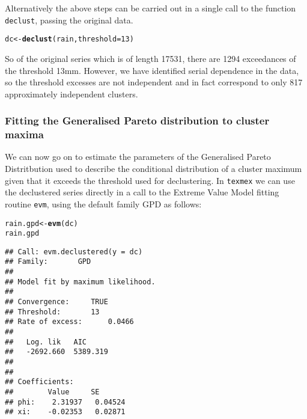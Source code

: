 \documentclass[10pt]{article}\usepackage[]{graphicx}\usepackage[]{color}
\makeatletter
\newcommand{\hlnum}[1]{\textcolor[rgb]{0.686,0.059,0.569}{#1}}%
\newcommand{\hlstd}[1]{\textcolor[rgb]{0.345,0.345,0.345}{#1}}%
\newcommand{\hlkwb}[1]{\textcolor[rgb]{0.69,0.353,0.396}{#1}}%
\newcommand{\hlkwc}[1]{\textcolor[rgb]{0.333,0.667,0.333}{#1}}%
\newcommand{\hlkwd}[1]{\textcolor[rgb]{0.737,0.353,0.396}{\textbf{#1}}}%
\newenvironment{kframe}{%
 \def\at@end@of@kframe{}%
 \ifinner\ifhmode%
  \def\at@end@of@kframe{\end{minipage}}%
  \begin{minipage}{\columnwidth}%
 \fi\fi%
 \def\FrameCommand##1{\hskip\@totalleftmargin \hskip-\fboxsep
 \colorbox{shadecolor}{##1}\hskip-\fboxsep
     \hskip-\linewidth \hskip-\@totalleftmargin \hskip\columnwidth}%
 \MakeFramed {\advance\hsize-\width
   \@totalleftmargin\z@ \linewidth\hsize
   \@setminipage}}%
 {\par\unskip\endMakeFramed%
 \at@end@of@kframe}
\newenvironment{knitrout}{}{} %
\makeatother
\begin{document}
Alternatively the above steps can be carried out in a single call to the function {\tt declust}, passing the original data.

\begin{knitrout}
\color{fgcolor}\begin{kframe}
\begin{alltt}
\hlstd{dc} \hlkwb{<-} \hlkwd{declust}\hlstd{(rain,} \hlkwc{threshold}\hlstd{=}\hlnum{13}\hlstd{)}
\end{alltt}
\end{kframe}
\end{knitrout}

So of the original series which is of length 17531, there are 1294 exceedances of the threshold 13mm.  However, we have identified serial dependence in the data, so the threshold excesses are not independent and in fact correspond to only 817 approximately independent clusters.

\subsubsection*{Fitting the Generalised Pareto distribution to cluster maxima}

We can now go on to estimate the parameters of the Generalised Pareto Distritbution used to describe the conditional distribution of a cluster maximum given that it exceeds the threshold used for declustering.  In {\tt texmex} we can use the declustered series directly in a call to the Extreme Value Model fitting routine {\tt evm}, using the default family GPD as follows:

\begin{knitrout}
\color{fgcolor}\begin{kframe}
\begin{alltt}
\hlstd{rain.gpd} \hlkwb{<-} \hlkwd{evm}\hlstd{(dc)}
\hlstd{rain.gpd}
\end{alltt}
\begin{verbatim}
## Call: evm.declustered(y = dc)
## Family:       GPD 
## 
## Model fit by maximum likelihood.
## 
## Convergence:		TRUE
## Threshold:		13
## Rate of excess:		0.0466
## 
##   Log. lik   AIC     
##   -2692.660  5389.319
## 
## 
## Coefficients:
##        Value     SE      
## phi:    2.31937   0.04524
## xi:    -0.02353   0.02871
\end{verbatim}
\end{kframe}
\end{knitrout}
\end{document}
